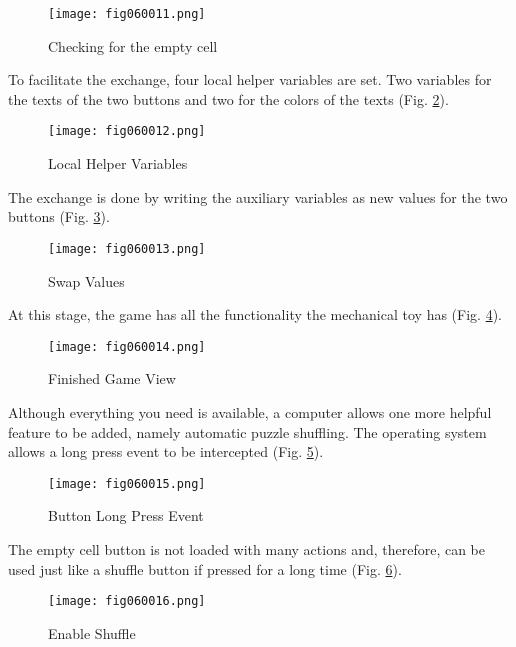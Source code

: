 \begin{figure}[H]
   \centering
   \texttt{[image: fig060011.png]}
   \caption{Checking for the empty cell}
\label{fig060011}
\end{figure}

To facilitate the exchange, four local helper variables are set. Two variables for the texts of the two buttons and two for the colors of the texts (Fig. \ref{fig060012}).

\begin{figure}[H]
   \centering
   \texttt{[image: fig060012.png]}
   \caption{Local Helper Variables}
\label{fig060012}
\end{figure}

The exchange is done by writing the auxiliary variables as new values for the two buttons (Fig. \ref{fig060013}).

\begin{figure}[H]
   \centering
   \texttt{[image: fig060013.png]}
   \caption{Swap Values}
\label{fig060013}
\end{figure}

At this stage, the game has all the functionality the mechanical toy has (Fig. \ref{fig060014}).

\begin{figure}[H]
   \centering
   \texttt{[image: fig060014.png]}
   \caption{Finished Game View}
\label{fig060014}
\end{figure}

Although everything you need is available, a computer allows one more helpful feature to be added, namely automatic puzzle shuffling. The operating system allows a long press event to be intercepted (Fig. \ref{fig060015}).

\begin{figure}[H]
   \centering
   \texttt{[image: fig060015.png]}
   \caption{Button Long Press Event}
\label{fig060015}
\end{figure}

The empty cell button is not loaded with many actions and, therefore, can be used just like a shuffle button if pressed for a long time (Fig. \ref{fig060016}).

\begin{figure}[H]
   \centering
   \texttt{[image: fig060016.png]}
   \caption{Enable Shuffle}
\label{fig060016}
\end{figure}

